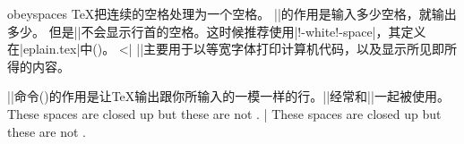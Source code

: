 \enddesc
%
%

\begindesc
\cts obeyspaces {}
\explain
\TeX{}把连续的空格处理为一个空格。
|\obeyspaces|的作用是输入多少空格，就输出多少。
但是|\obeyspaces|不会显示行首的空格。这时候推荐使用|\obey!-white!-space|，其定义在|eplain.tex|中()。
^^|\obeywhitespace|
|\obeyspaces|主要用于以等宽字体打印计算机代码，以及显示所见即所得的内容。


|\obeylines|命令(\xref{\obeylines})的作用是让\TeX{}输出跟你所输入的一模一样的行。|\obeylines|经常和|\obeyspaces|一起被使用。
\example
These     spaces    are    closed   up
{\obeyspaces but   these  are     not   }.
|
\produces
These     spaces    are    closed   up
{\obeyspaces but   these  are     not   }.
\endexample
\enddesc




